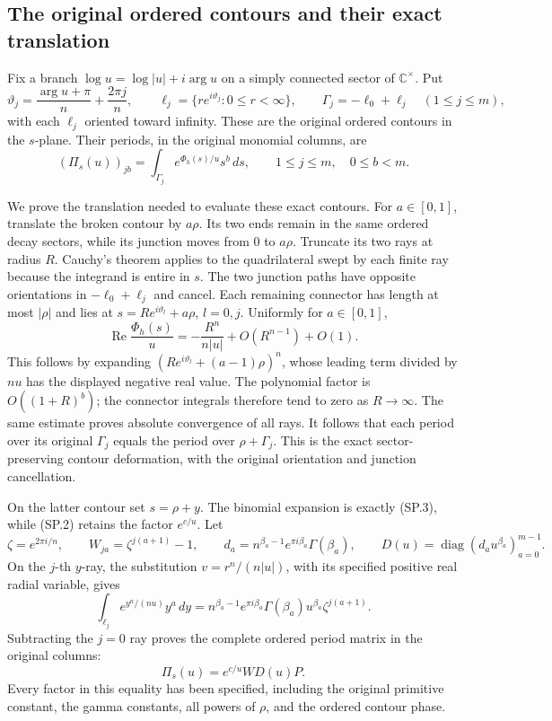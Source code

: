 \subsection{The original ordered contours and their exact translation}

Fix a branch \(\log u=\log|u|+i\arg u\) on a simply connected
sector of \(\mathbb C^\times\). Put
\[
 \vartheta_j=\frac{\arg u+\pi}{n}+\frac{2\pi j}{n},\qquad
 \ell_j=\{r e^{i\vartheta_j}:0\le r<\infty\},\qquad
 \Gamma_j=-\ell_0+\ell_j\quad(1\le j\le m),
 \tag{SP.10}\label{eq:sp-contours}
\]
with each \(\ell_j\) oriented toward infinity.
These are the original ordered contours in the \(s\)-plane.
Their periods, in the original monomial columns, are
\[
 (\Pi_s(u))_{jb}
   =\int_{\Gamma_j} e^{\Phi_h(s)/u}s^b\,ds ,
       \qquad 1\le j\le m,\quad0\le b<m.
 \tag{SP.11}\label{eq:sp-perioddef}
\]

We prove the translation needed to evaluate these exact contours.
For \(a\in[0,1]\), translate the broken contour by \(a\rho\).
Its two ends remain in the same ordered decay sectors, while
its junction moves from \(0\) to \(a\rho\).
Truncate its two rays at radius \(R\).
Cauchy's theorem applies to the quadrilateral swept by each
finite ray because the integrand is entire in \(s\).
The two junction paths have opposite orientations in
\(-\ell_0+\ell_j\) and cancel. Each remaining connector has
length at most \(|\rho|\) and lies at
\(s=R e^{i\vartheta_l}+a\rho\), \(l=0,j\).
Uniformly for \(a\in[0,1]\),
\[
 \operatorname{Re}\frac{\Phi_h(s)}u
 =-\frac{R^n}{n|u|}+O(R^{n-1})+O(1).
 \tag{SP.12}\label{eq:sp-decay}
\]
This follows by expanding
\((R e^{i\vartheta_l}+(a-1)\rho)^n\), whose leading term
divided by \(nu\) has the displayed negative real value.
The polynomial factor is \(O((1+R)^b)\); the connector
integrals therefore tend to zero as \(R\to\infty\).
The same estimate proves absolute convergence of all rays.
It follows that each period over its original \(\Gamma_j\)
equals the period over \(\rho+\Gamma_j\).
This is the exact sector-preserving contour deformation,
with the original orientation and junction cancellation.

On the latter contour set \(s=\rho+y\).
The binomial expansion is exactly (SP.3), while (SP.2)
retains the factor \(e^{c/u}\).
Let
\[
 \zeta=e^{2\pi i/n},\qquad
 W_{ja}=\zeta^{j(a+1)}-1,\qquad
 d_a=n^{\beta_a-1}e^{\pi i\beta_a}\Gamma(\beta_a),\qquad
 D(u)=\operatorname{diag}(d_a u^{\beta_a})_{a=0}^{m-1}.
 \tag{SP.13}\label{eq:sp-gamma}
\]
On the \(j\)-th \(y\)-ray, the substitution
\(v=r^n/(n|u|)\), with its specified positive real radial
variable, gives
\[
 \int_{\ell_j} e^{y^n/(nu)}y^a\,dy
 =n^{\beta_a-1}e^{\pi i\beta_a}
       \Gamma(\beta_a)u^{\beta_a}\zeta^{j(a+1)} .
 \]
Subtracting the \(j=0\) ray proves the complete ordered period
matrix in the original columns:
\[
 \boxed{\quad \Pi_s(u)=e^{c/u}W D(u)P .\quad}
 \tag{SP.14}\label{eq:sp-periodmatrix}
\]
Every factor in this equality has been specified, including the
original primitive constant, the gamma constants, all powers of
\(\rho\), and the ordered contour phase.

